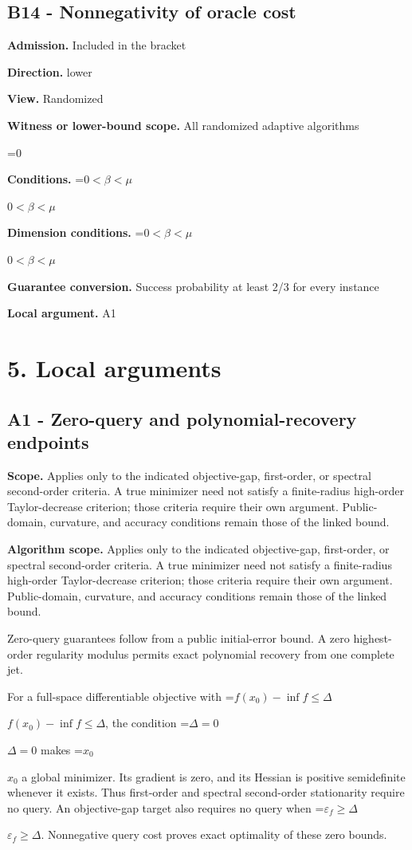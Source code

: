 \documentclass[10pt,a4paper]{article}
\newcommand{\AtlasMath}[1]{\par\begingroup\centering\setbox0=\hbox{$\displaystyle #1$}\ifdim\wd0>1.4\linewidth\typeout{ATLAS WIDE FORMULA: \the\wd0}\fi\ifdim\wd0>\linewidth\resizebox{\linewidth}{!}{\box0}\else\box0\fi\par\endgroup}
\newcommand{\AtlasInlineMath}[1]{\begingroup\setbox0=\hbox{$#1$}\ifdim\wd0>.4\linewidth\endgroup\AtlasMath{#1}\else\endgroup$#1$\fi}
\begin{document}
\subsection{B14 - Nonnegativity of oracle cost}
\textbf{Admission.} Included in the bracket

\textbf{Direction.} lower

\textbf{View.} Randomized

\textbf{Witness or lower-bound scope.} All randomized adaptive algorithms

\AtlasMath{0}
\textbf{Conditions.} \AtlasInlineMath{0<\beta<\mu}

\textbf{Dimension conditions.} \AtlasInlineMath{0<\beta<\mu}

\textbf{Guarantee conversion.} Success probability at least 2/3 for every instance

\textbf{Local argument.} A1

\section{5. Local arguments}
\subsection{A1 - Zero-query and polynomial-recovery endpoints}
\textbf{Scope.} Applies only to the indicated objective-gap, first-order, or spectral second-order criteria. A true minimizer need not satisfy a finite-radius high-order Taylor-decrease criterion; those criteria require their own argument. Public-domain, curvature, and accuracy conditions remain those of the linked bound.

\textbf{Algorithm scope.} Applies only to the indicated objective-gap, first-order, or spectral second-order criteria. A true minimizer need not satisfy a finite-radius high-order Taylor-decrease criterion; those criteria require their own argument. Public-domain, curvature, and accuracy conditions remain those of the linked bound.

Zero-query guarantees follow from a public initial-error bound. A zero highest-order regularity modulus permits exact polynomial recovery from one complete jet.

For a full-space differentiable objective with \AtlasInlineMath{f(x_0)-\inf f\le\Delta}, the condition \AtlasInlineMath{\Delta=0} makes \AtlasInlineMath{x_0} a global minimizer. Its gradient is zero, and its Hessian is positive semidefinite whenever it exists. Thus first-order and spectral second-order stationarity require no query. An objective-gap target also requires no query when \AtlasInlineMath{\varepsilon_f\ge\Delta}. Nonnegative query cost proves exact optimality of these zero bounds.
\end{document}
